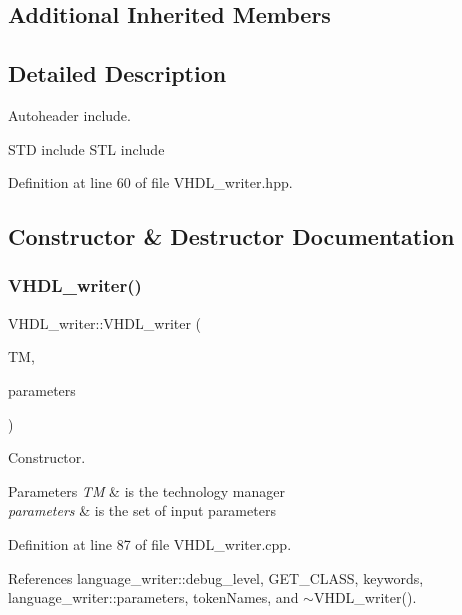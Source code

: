 \subsection*{Additional Inherited Members}


\subsection{Detailed Description}
Autoheader include. 

S\+TD include S\+TL include 

Definition at line 60 of file V\+H\+D\+L\+\_\+writer.\+hpp.



\subsection{Constructor \& Destructor Documentation}
\mbox{\label{structVHDL__writer_a710c73d9ba012835d394917ee0a45488}} 
\subsubsection{\texorpdfstring{V\+H\+D\+L\+\_\+writer()}{VHDL\_writer()}}
{\footnotesize\ttfamily V\+H\+D\+L\+\_\+writer\+::\+V\+H\+D\+L\+\_\+writer (\begin{DoxyParamCaption}\item[{const technology\+\_\+manager\+Const\+Ref}]{TM,  }\item[{const \hyperlink{Parameter_8hpp_a37841774a6fcb479b597fdf8955eb4ea}{Parameter\+Const\+Ref}}]{parameters }\end{DoxyParamCaption})}



Constructor. 


\begin{DoxyParams}{Parameters}
{\em TM} & is the technology manager \\
\hline
{\em parameters} & is the set of input parameters \\
\hline
\end{DoxyParams}


Definition at line 87 of file V\+H\+D\+L\+\_\+writer.\+cpp.



References language\+\_\+writer\+::debug\+\_\+level, G\+E\+T\+\_\+\+C\+L\+A\+SS, keywords, language\+\_\+writer\+::parameters, token\+Names, and $\sim$\+V\+H\+D\+L\+\_\+writer().




